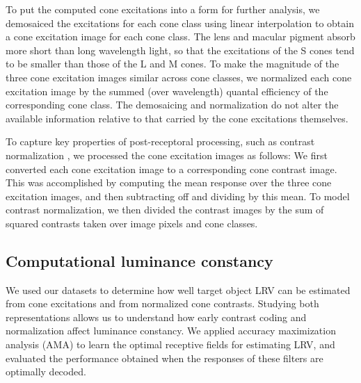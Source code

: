 \documentclass{jov}
\begin{document}
To put the computed cone excitations into a form for further analysis, we demosaiced the excitations for each cone class using linear interpolation
to obtain a cone excitation image for each cone class.
The lens and macular pigment absorb more short than long wavelength light, so that the excitations of the S cones tend to be
smaller than those of the L and M cones.
To make the magnitude of the three cone excitation images similar across cone classes, we
normalized each cone excitation image by the summed (over wavelength) quantal efficiency of the corresponding cone class.
The demosaicing and normalization do not alter the available information relative to that carried by the cone excitations themselves. 

To capture key properties of post-receptoral processing, such as contrast normalization \cite{heeger1992normalization,albrecht1991motion,carandini2012normalization}, 
we processed the cone excitation images as follows:
We first converted each cone excitation image to a corresponding cone contrast image.
This was accomplished by computing the mean response over the three cone excitation images, and then subtracting off and dividing by this mean.
To model contrast normalization, we then divided the contrast images by the sum of squared contrasts taken over image pixels and cone classes.

\subsection{Computational luminance constancy} \label{method:SupervisedLearning}
We used our datasets to determine how well target object LRV can be estimated from cone excitations and from normalized cone contrasts.
Studying both representations allows us to understand how early contrast coding and normalization affect luminance constancy.
We applied accuracy maximization analysis (AMA) to learn the optimal receptive fields for estimating LRV,
and evaluated the performance obtained when the responses of these filters are optimally decoded.
\end{document}
